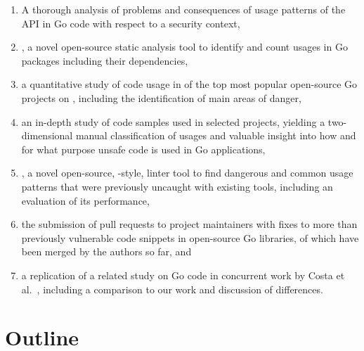 \begin{enumerate}
    \item A thorough analysis of problems and consequences of usage patterns of the \unsafe{} \acrshort{API} in Go code
    with respect to a security context,

    \item \toolGeiger, a novel open-source static analysis tool to identify and count \unsafe{} usages in Go packages
    including their dependencies,

    \item a quantitative study of \unsafe{} code usage in \projsAnalyzed{} of the top \projsTotal{} most popular
    open-source Go projects on \github{}, including the identification of  main areas of danger,

    \item an in-depth study of \numberLabeledCodeSnippets{} code samples used in \projsForLabeledCodeSnippets{} selected
    projects, yielding a two-dimensional manual classification of usages and valuable insight into how and for what
    purpose unsafe code is used in Go applications,

    \item \toolSafer{}, a novel open-source, \toolVet{}-style, linter tool to find  dangerous and common
    \unsafe{} usage patterns that were previously uncaught with existing tools, including an evaluation of its
    performance,

    \item the submission of \numberPRs{} pull requests to project maintainers with fixes to more than
    \numberBugsFixedRounded{} previously vulnerable code snippets in open-source Go libraries, \numberPRsMerged{} of
    which have been merged by the authors so far, and

    \item a replication of a related study on \unsafe{} Go code in concurrent work by Costa et al.~\cite{costa2020},
    including a comparison to our work and discussion of differences.
\end{enumerate}



\section{Outline}\label{sec:introduction:outline}

